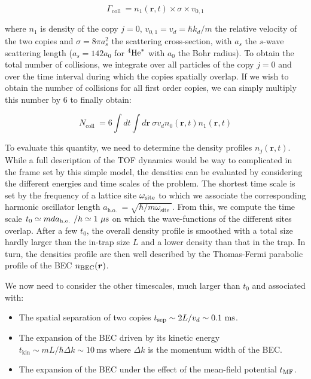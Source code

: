 \begin{equation}
    \Gamma_{\text {coll }}=n_{1}(\bm{r}, t) \times \sigma \times v_{0,1}
\end{equation}

\noindent where $n_1$ is density of the copy $j=0$, $v_{0,1}=v_d=\hbar k_d/m$ the relative velocity of the two copies and $\sigma= 8 \pi a_s^2$ the scattering cross-section, with $a_s$ the $s$-wave scattering length ($a_s = 142 a_0$ for $^4\mathrm{He}^*$ with $a_0$ the Bohr radius). To obtain the total number of collisions, we integrate over all particles of the copy $j=0$ and over the time interval during which the copies spatially overlap. If we wish to obtain the number of collisions for all first order copies, we can simply multiply this number by $6$ to finally obtain:

\begin{equation}
    N_{\text {coll }}=6 \int d t \int d \bm{r} \ \sigma v_{d} n_{0}(\bm{r}, t) n_{1}(\bm{r}, t)
    \label{eq:coll_model_general}
\end{equation}

To evaluate this quantity, we need to determine the density profiles $n_{j}(\bm{r}, t)$. While a full description of the TOF dynamics would be way to complicated in the frame set by this simple model, the densities can be evaluated by considering the different energies and time scales of the problem. The shortest time scale is set by the frequency of a lattice site $\omega_{\rm{site}}$ to which we associate the corresponding harmonic oscillator length $a_{\text {h.o. }}=\sqrt{\hbar / m \omega_{\text {site }}}$. From this, we compute the time scale $t_0 \simeq m d a_{\text {h.o. }} /h \simeq 1 \ \mu \rm{s}$ on which the wave-functions of the different sites overlap. After a few $t_0$, the overall density profile is smoothed with a total size hardly larger than the in-trap size $L$ and a lower density than that in the trap. In turn, the densities profile are then well described by the Thomas-Fermi parabolic profile of the BEC $n_{\rm{BEC}}(\bm{r})$.

We now need to consider the other timescales, much larger than $t_0$ and associated with:

\begin{itemize}
    \item The spatial separation of two copies $t_{\rm{sep}} \sim 2L/v_d \sim 0.1 \ \rm{ms}$.
    \item The expansion of the BEC driven by its kinetic energy $t_{\mathrm{kin}} \sim m L / \hbar \Delta k \sim 10 \mathrm{~ms}$ where $\Delta k$ is the momentum width of the BEC.
    \item The expansion of the BEC under the effect of the mean-field potential $t_{\rm{MF}}$.
\end{itemize}

